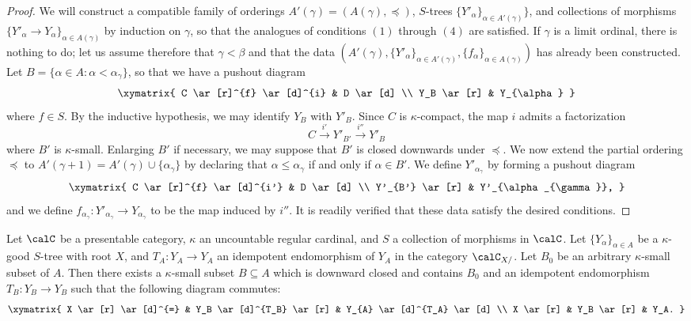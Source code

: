 \begin{CategoryTheory}
\begin{Didn't Read}
\begin{proof}
We will construct a compatible family of orderings $A'(\gamma) = (A(\gamma), \preceq)$, $S$-trees $\{ Y'_{\alpha} \}_{ \alpha \in A'(\gamma)} \}$, and collections of morphisms 
$\{ Y'_{\alpha} \rightarrow Y_{\alpha} \}_{\alpha \in A(\gamma)}$ by induction on $\gamma$, so that the analogues of conditions $(1)$ through $(4)$ are satisfied. If $\gamma$ is a limit ordinal, there is nothing to do; let us assume therefore that $\gamma < \beta$ and that the data
$( A'(\gamma), \{ Y'_{\alpha} \}_{\alpha \in A'(\gamma)}, \{ f_{\alpha} \}_{\alpha \in A(\gamma)} )$ has already been constructed. Let $B = \{ \alpha \in A: \alpha < \alpha_{\gamma} \}$, so that we have a pushout diagram
$$ \xymatrix{ C \ar[r]^{f} \ar[d]^{i} & D \ar[d] \\
Y_B \ar[r] & Y_{\alpha} }$$
where $f \in S$. By the inductive hypothesis, we may identify $Y_{B}$ with $Y'_{B}$. 
Since $C$ is $\kappa$-compact, the map $i$ admits a factorization
$$C \stackrel{i'}{\rightarrow} Y'_{B'} \stackrel{i''}{\rightarrow} Y'_{B}$$
where $B'$ is $\kappa$-small. Enlarging $B'$ if necessary, we may suppose that
$B'$ is closed downwards under $\preceq$. We now extend the partial ordering
$\preceq$ to $A'(\gamma+1) = A'(\gamma) \cup \{ \alpha_{\gamma} \}$ by declaring that
$\alpha \leq \alpha_{\gamma}$ if and only if $\alpha \in B'$. We define
$Y'_{\alpha_{\gamma}}$ by forming a pushout diagram
$$ \xymatrix{ C \ar[r]^{f} \ar[d]^{i'} & D \ar[d] \\
Y'_{B'} \ar[r] & Y'_{\alpha_{\gamma}}, }$$
and we define $f_{\alpha_{\gamma}}: Y'_{\alpha_{\gamma}} \rightarrow Y_{\alpha_{\gamma}}$
to be the map induced by $i''$. It is readily verified that these data satisfy the desired conditions.
\end{proof}

\begin{lemma}\label{turkteck}
Let $\calC$ be a presentable category, $\kappa$ an uncountable regular cardinal, and 
$S$ a collection of morphisms in $\calC$. Let $\{ Y_{\alpha} \}_{\alpha \in A}$ be a $\kappa$-good $S$-tree with root $X$, and $T_A: Y_{A} \rightarrow Y_{A}$ an idempotent endomorphism of
$Y_{A}$ in the category $\calC_{X/}$. Let $B_0$ be an arbitrary $\kappa$-small subset of
$A$. Then there exists a $\kappa$-small subset $B \subseteq A$ which is downward closed and contains $B_0$ and an idempotent endomorphism $T_{B}: Y_{B} \rightarrow Y_{B}$
such that the following diagram commutes:
$$ \xymatrix{ X \ar[r] \ar[d]^{=} & Y_B \ar[d]^{T_B} \ar[r] & Y_{A} \ar[d]^{T_A} \ar[d] \\
X \ar[r] & Y_B \ar[r] & Y_A. }$$
\end{lemma}


\end{Didn't Read}
\end{CategoryTheory}
